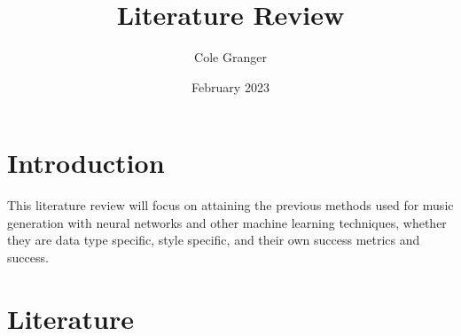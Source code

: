\documentclass{article}
\title{Literature Review}
\author{Cole Granger}
\date{February 2023}
\begin{document}
\maketitle

\section{Introduction}
This literature review will focus on attaining the previous methods used for music generation with neural networks and other machine learning techniques, whether they are data type specific, style specific, and their own success metrics and success.

\section{Literature}
\end{document}
